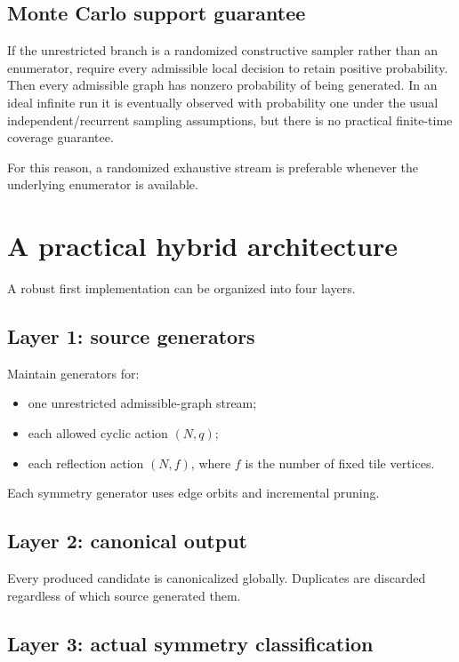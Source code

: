 \documentclass[11pt]{article}
\begin{document}
\subsection{Monte Carlo support guarantee}

If the unrestricted branch is a randomized constructive sampler rather than an enumerator, require every admissible local decision to retain positive probability. Then every admissible graph has nonzero probability of being generated. In an ideal infinite run it is eventually observed with probability one under the usual independent/recurrent sampling assumptions, but there is no practical finite-time coverage guarantee.

For this reason, a randomized exhaustive stream is preferable whenever the underlying enumerator is available.

\section{A practical hybrid architecture}

A robust first implementation can be organized into four layers.

\subsection*{Layer 1: source generators}

Maintain generators for:
\begin{itemize}
  \item one unrestricted admissible-graph stream;
  \item each allowed cyclic action \((N,q)\);
  \item each reflection action \((N,f)\), where \(f\) is the number of fixed tile vertices.
\end{itemize}

Each symmetry generator uses edge orbits and incremental pruning.

\subsection*{Layer 2: canonical output}

Every produced candidate is canonicalized globally. Duplicates are discarded regardless of which source generated them.

\subsection*{Layer 3: actual symmetry classification}
\end{document}
